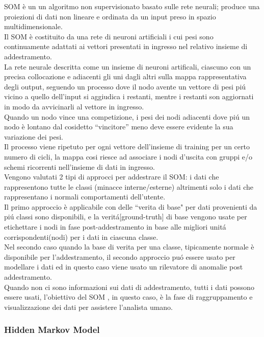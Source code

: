 \documentclass[../tesi.tex]{subfiles}
\begin{document}
SOM è un un algoritmo non supervisionato basato sulle rete neurali; produce una proiezioni di dati non lineare e ordinata da un input preso in spazio multidimensionale.\\
Il SOM è costituito da una rete di neuroni artificiali i cui pesi sono continuamente adattati ai vettori presentati in ingresso nel relativo insieme di addestramento.\\
La rete neurale descritta come un insieme di neuroni artificali, ciascuno con un precisa collocazione e adiacenti gli uni dagli altri sulla mappa rappresentativa degli output, seguendo un processo dove il nodo avente un vettore di pesi piú vicino a quello dell’input si aggiudica i restanti, mentre i restanti son aggiornati in modo da avvicinarli al vettore in ingresso.\\
Quando un nodo vince una competizione, i pesi dei nodi adiacenti dove piú un nodo è lontano dal cosidetto “vincitore” meno deve essere evidente la sua variazione dei pesi.\\
Il processo viene ripetuto per ogni vettore dell’insieme di training per un certo numero di cicli, la mappa cosi riesce ad associare i nodi d’uscita con gruppi e/o schemi ricorrenti nell’insieme di dati in ingresso.\\
Vengono valutati 2 tipi di approcci per addestrare il SOM: i dati che rappresentono tutte le classi (minacce interne/esterne) altrimenti solo i dati che rappresentano i normali comportamenti dell’utente.\\
Il primo approccio è applicabile con delle ``verita di base" per dati provenienti da piú classi sono disponibili, e la veritá[ground-truth] di base vengono usate per etichettare i nodi in fase post-addestramento in base alle migliori unitá corrispondenti(nodi) per i dati in ciascuna classe.\\
Nel secondo caso quando la base di verita per una classe, tipicamente normale è disponibile per l’addestramento, il secondo approccio puó essere usato per modellare i dati ed in questo caso viene usato un rilevatore di anomalie post addestramento.\\
Quando non ci sono informazioni sui dati di addestramento, tutti i dati possono essere usati, l’obiettivo del SOM , in questo caso, è la fase di raggruppamento e visualizzazione dei dati per assistere l’analista umano.

\subsubsection{Hidden Markov Model}
\end{document}
